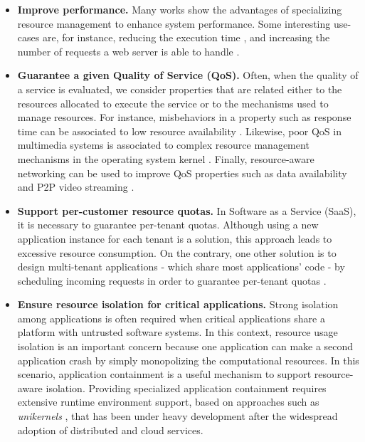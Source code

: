 \begin{itemize}
\item \textbf{Improve performance.}
Many works show the advantages of specializing resource management to enhance system performance.
Some interesting use-cases are, for instance, reducing the execution time \cite{Polo:2011:RAS:2414338.2414352}, and increasing the number of requests a web server is able to handle \cite{engler1995exokernel,Belay:2014:IPD:2685048.2685053}.

\item \textbf{Guarantee a given Quality of Service (QoS).} 
Often, when the quality of a service is evaluated, we consider properties that are related either to the resources allocated to execute the service or to the mechanisms used to manage resources.
For instance, misbehaviors in a property such as response time can be associated to low resource availability \cite{Chechik-2009,autili2012hybrid}.
Likewise, poor QoS in multimedia systems is associated to complex resource management mechanisms in the operating system kernel \cite{Black1997}.
Finally, resource-aware networking can be used to improve QoS properties such as data availability \cite{Boldrini:2008:CRA:1549824.1550106} and P2P video streaming \cite{Pianese:2007:RLA:1326320.1326323,Alhaisoni:2010:RTO:1664767.1664770}.

\item \textbf{Support per-customer resource quotas.}
In Software as a Service (SaaS), it is necessary to guarantee per-tenant quotas.
Although using a new application instance for each tenant is a solution, this approach leads to excessive resource consumption.
On the contrary, one other solution is to design multi-tenant applications - which share most applications' code - by scheduling incoming requests in order to guarantee per-tenant quotas \cite{KrSpAhKo2014_CCGrid_ResourceIsolation,KrWeKo2013-icwe-MTBenchmark}.    

\item \textbf{Ensure resource isolation for critical applications.}
Strong isolation among applications is often required when critical applications \cite{Knight:2002:SCS:581339.581406} share a platform with untrusted software systems.
In this context, resource usage isolation is an important concern because one application can make a second application crash by simply monopolizing the computational resources.
In this scenario, application containment \cite{Kamp00jails:confining,Soltesz:2007:COS:1272998.1273025,Madhavapeddy:2015:JJS:2789770.2789809} is a useful mechanism to support resource-aware isolation.
Providing specialized application containment requires extensive runtime environment support, based on approaches such as \textit{unikernels} \cite{Madhavapeddy:2013:ULO:2499368.2451167, Kivity:2014:OVO:2643634.2643642, Madhavapeddy:2015:JJS:2789770.2789809}, that has been under heavy development after the widespread adoption of distributed and cloud services.  

\end{itemize}

